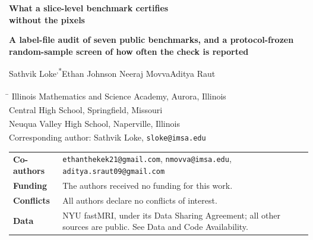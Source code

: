 \documentclass[11pt,a4paper]{article}
\newcommand{\todo}[1]{\textbf{[#1]}}
\newcommand{\affmark}[1]{\textsuperscript{\normalfont #1}}
\begin{document}
\thispagestyle{empty}

\begin{center}
{\LARGE\bfseries What a slice-level benchmark certifies\\ without the pixels\par}
\vspace{0.55em}
{\large\bfseries A label-file audit of seven public benchmarks, and a
protocol-frozen\\ random-sample screen of how often the check is reported\par}

\vspace{1.6em}

{\large Sathvik Loke\affmark{1,*}\quad Ethan Johnson\affmark{2}\quad
Neeraj Movva\affmark{1}\quad Aditya Raut\affmark{3}\par}
\end{center}

\vspace{0.9em}

{\small
\begin{tabbing}
\hspace{1.3em}\=\kill
\affmark{1}\>Illinois Mathematics and Science Academy, Aurora, Illinois\\
\affmark{2}\>Central High School, Springfield, Missouri\\
\affmark{3}\>Neuqua Valley High School, Naperville, Illinois\\[0.5em]
\affmark{*}\>Corresponding author: Sathvik Loke, \texttt{sloke@imsa.edu}
\end{tabbing}

\vspace{-0.4em}
\begin{tabular}{@{}p{}@{}p{}@{}}
\textbf{Co-authors} & \texttt{ethanthekek21@gmail.com}, \texttt{nmovva@imsa.edu},
\texttt{aditya.sraut09@gmail.com}\\[0.35em]
\textbf{Funding} & The authors received no funding for this work.\\[0.35em]
\textbf{Conflicts} & All authors declare no conflicts of interest.\\[0.35em]
\textbf{Data} & NYU fastMRI, under its Data Sharing Agreement; all other
sources are public. See Data and Code Availability.\\
\end{tabular}
}

\end{document}
